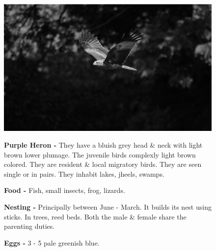 \begin{figure}[H]
\begin{center}
\includegraphics{figure/Land_birds/01_pariah_kite/pariah-kite.eps}
\end{center}
\medskip
\noindent
{\bf Purple Heron -} They have a bluish grey head \& neck with light brown lower plumage. The juvenile birds complexly light brown colored. They are resident \& local migratory birds. They are seen single or in pairs. They inhabit lakes, jheels, swamps.

\medskip
{\bf Food -} Fish, small insects, frog, lizards.

{\bf Nesting -} Principally between June - March. It builds its nest using sticks. In trees, reed beds. Both the male \& female share the parenting duties.

{\bf Eggs -} 3 - 5 pale greenish blue.
\end{figure}

\vfill\eject

~\phantom{a}
\vfill

